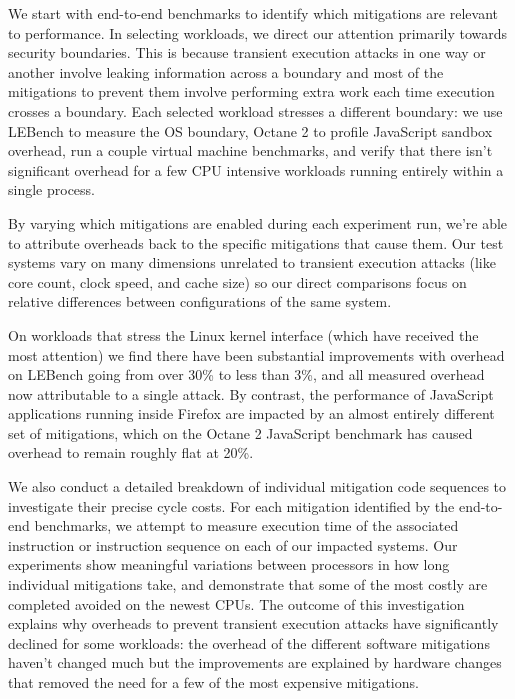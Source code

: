 We start with end-to-end benchmarks to identify which mitigations are relevant to performance.
In selecting workloads, we direct our attention primarily towards security boundaries.
This is because transient execution attacks in one way or another involve leaking information across a boundary and most of the mitigations to prevent them involve performing extra work each time execution crosses a boundary. 
Each selected workload stresses a different boundary: we use LEBench to measure the OS boundary, Octane 2 to profile JavaScript sandbox overhead, run a couple virtual machine benchmarks, and verify that there isn't significant overhead for a few CPU intensive workloads running entirely within a single process.

By varying which mitigations are enabled during each experiment run, we're able to attribute overheads back to the specific mitigations that cause them.
Our test systems vary on many dimensions unrelated to transient execution attacks (like core count, clock speed, and cache size) so our direct comparisons focus on relative differences between configurations of the same system.

On workloads that stress the Linux kernel interface (which have received the most attention) we find there have been substantial improvements with overhead on LEBench going from over 30\% to less than 3\%, and all measured overhead now attributable to a single attack.
By contrast, the performance of JavaScript applications running inside Firefox are impacted by an almost entirely different set of mitigations, which on the Octane 2 JavaScript benchmark has caused overhead to remain roughly flat at 20\%.

We also conduct a detailed breakdown of individual mitigation code sequences to investigate their precise cycle costs.
For each mitigation identified by the end-to-end benchmarks, we attempt to measure execution time of the associated instruction or instruction sequence on each of our impacted systems.
Our experiments show meaningful variations between processors in how long individual mitigations take, and demonstrate that some of the most costly are completed avoided on the newest CPUs. 
The outcome of this investigation explains why overheads to prevent transient execution attacks have significantly declined for some workloads: the overhead of the different software mitigations haven't changed much but the improvements are explained by hardware changes that removed the need for a few of the most expensive mitigations.

